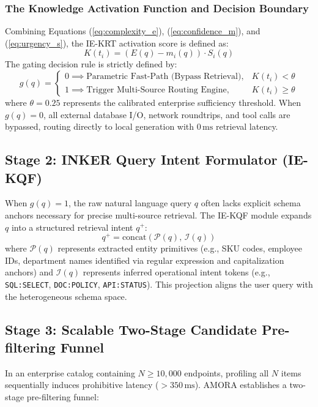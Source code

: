 \subsubsection{The Knowledge Activation Function and Decision Boundary}
Combining Equations (\ref{eq:complexity_e}), (\ref{eq:confidence_m}), and (\ref{eq:urgency_s}), the IE-KRT activation score is defined as:
\begin{equation}
    K(t_i) = \left( E(q) - m_i(q) \right) \cdot S_i(q)
    \label{eq:k_activation}
\end{equation}
The gating decision rule is strictly defined by:
\begin{equation}
    g(q) = \begin{cases} 
      0 \implies \text{Parametric Fast-Path (Bypass Retrieval)}, & K(t_i) < \theta \\
      1 \implies \text{Trigger Multi-Source Routing Engine}, & K(t_i) \ge \theta
   \end{cases}
   \label{eq:gating_rule}
\end{equation}
where $\theta = 0.25$ represents the calibrated enterprise sufficiency threshold. When $g(q) = 0$, all external database I/O, network roundtrips, and tool calls are bypassed, routing directly to local generation with $0\,\text{ms}$ retrieval latency.

\subsection{Stage 2: INKER Query Intent Formulator (IE-KQF)}
When $g(q) = 1$, the raw natural language query $q$ often lacks explicit schema anchors necessary for precise multi-source retrieval. The IE-KQF module expands $q$ into a structured retrieval intent $q^+$:
\begin{equation}
    q^+ = \text{concat}\left( \mathcal{P}(q), \, \mathcal{I}(q) \right)
\end{equation}
where $\mathcal{P}(q)$ represents extracted entity primitives (e.g., SKU codes, employee IDs, department names identified via regular expression and capitalization anchors) and $\mathcal{I}(q)$ represents inferred operational intent tokens (e.g., \texttt{SQL:SELECT}, \texttt{DOC:POLICY}, \texttt{API:STATUS}). This projection aligns the user query with the heterogeneous schema space.

\subsection{Stage 3: Scalable Two-Stage Candidate Pre-filtering Funnel}
In an enterprise catalog containing $N \ge 10,000$ endpoints, profiling all $N$ items sequentially induces prohibitive latency ($>350\,\text{ms}$). AMORA establishes a two-stage pre-filtering funnel:

